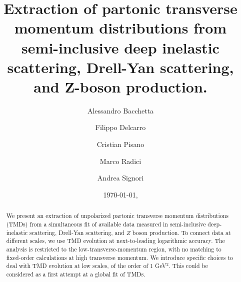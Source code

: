 \documentclass[aps,preprintnumbers,showpacs,nofootinbib,superscriptaddress,floatfix]{revtex4}
\begin{document}
\allowdisplaybreaks[2]


\title{
Extraction of partonic transverse momentum distributions 
from semi-inclusive deep
inelastic scattering, Drell-Yan scattering, and Z-boson production.
}

\author{Alessandro Bacchetta}

\author{Filippo Delcarro}

\author{Cristian Pisano}

\author{Marco Radici}

\author{Andrea Signori}


\begin{abstract}
We present an extraction of unpolarized partonic transverse momentum
distributions (TMDs) 
from a simultaneous fit of available data measured in semi-inclusive 
deep-inelastic scattering, 
Drell-Yan scattering, and $Z$ boson production. 
To connect data at different scales, we use TMD evolution at next-to-leading logarithmic accuracy. The
analysis is restricted to the low-transverse-momentum region, with no matching
to fixed-order calculations at high transverse momentum. We introduce specific
choices to deal with TMD evolution at low scales, of the order of 1 GeV$^2$.
This could be considered as a first attempt at a global fit of TMDs.
\end{abstract}


\date{\today, \currenttime}
\end{document}
